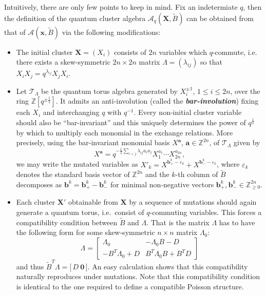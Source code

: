 \documentclass[12pt]{amsart}
\newcommand{\bfa}{\mathbf{a}}
\newcommand{\bfb}{\mathbf{b}}
\newcommand{\bfx}{\mathbf{x}}
\newcommand{\bfX}{\mathbf{X}}
\newcommand{\cA}{\mathcal{A}}
\newcommand{\cT}{\mathcal{T}}
\newcommand{\half}{{\frac{1}{2}}}
\newcommand{\ZZ}{\mathbb{Z}}
\newcommand{\newword}[1]{\textbf{\emph{#1}}}
\begin{document}
  Intuitively, there are only few points to keep in mind.
  Fix an indetermiate $q$, then the definition of the quantum cluster algebra $\cA_q(\bfX,\widetilde B)$ can be obtained from that of $\cA(\bfx,\widetilde B)$ via the following modifications:
  \begin{itemize}
    \item 
      The initial cluster $\bfX=(X_i)$ consists of $2n$ variables which $q$-commute, i.e. there exists a skew-symmetric $2n\times 2n$ matrix $\Lambda=(\lambda_{ij})$ so that $X_iX_j=q^{\lambda_{ij}}X_jX_i$.  
    
    \item 
      Let $\cT_\Lambda$ be the quantum torus algebra generated by $X_i^{\pm1}$, $1\le i\le 2n$, over the ring $\ZZ[q^{\pm\half}]$.
      It admits an anti-involution (called the \newword{bar-involution}) fixing each $X_i$ and interchanging $q$ with $q^{-1}$.
      Every non-initial cluster variable should also be ``bar-invariant'' and this uniquely determines the power of $q^\half$ by which to multiply each monomial in the exchange relations.  
      More precisely, using the bar-invariant monomial basis $X^\bfa$, $\bfa\in\ZZ^{2n}$, of $\cT_\Lambda$ given by
      \[
        X^\bfa=q^{-\half\sum\limits_{i<j}\lambda_{ij}a_ia_j}X_1^{a_1}\cdots X_{2n}^{a_{2n}},
      \]
      we may write the mutated variables as $X'_k=X^{\bfb_+^k-\varepsilon_k}+X^{\bfb_-^k-\varepsilon_k}$, where $\varepsilon_k$ denotes the standard basis vector of $\ZZ^{2n}$ and the $k$-th column of $\widetilde{B}$ decomposes as $\bfb^k=\bfb^k_+-\bfb^k_-$ for minimal non-negative vectors $\bfb^k_+,\bfb^k_-\in\ZZ_{\ge0}^{2n}$.

    \item 
      Each cluster $\bfX'$ obtainable from $\bfX$ by a sequence of mutations should again generate a quantum torus, i.e.\ consist of $q$-commuting variables.
      This forces a compatibility condition between $\widetilde{B}$ and $\Lambda$.
      That is the matrix $\Lambda$ has to have the following form for some skew-symmetric $n\times n$ matrix $\Lambda_0$:
      \[
        \Lambda
        =
        \left[
          \begin{array}{cc}
            \Lambda_0 & -\Lambda_0B-D\\ 
            -B^T\Lambda_0+D & B^T\Lambda_0B+B^TD
          \end{array}
        \right]
      \]
      and thus $\widetilde{B}^T\Lambda=\big[\,D\ \boldsymbol{0}\,\big]$.
      An easy calculation shows that this compatibility naturally reproduces under mutations.
      Note that this compatibility condition is identical to the one required to define a compatible Poisson structure.

  \end{itemize}
\end{document}
